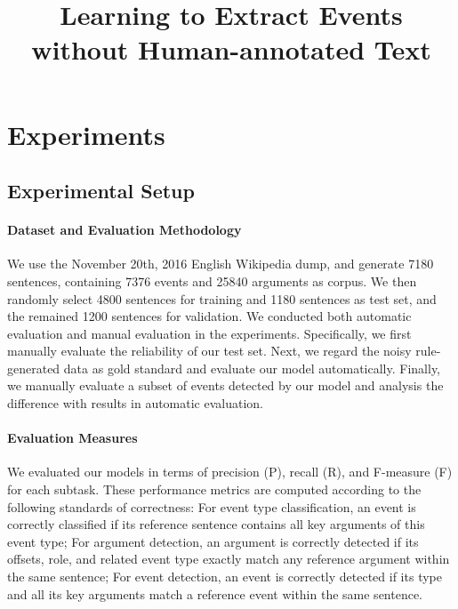 \documentclass{article}
\title{Learning to Extract Events without Human-annotated Text}
\begin{document}
\maketitle









\section{Experiments}
\subsection{Experimental Setup}
\paragraph{Dataset and Evaluation Methodology}
We use the November 20th, 2016 English Wikipedia dump, and generate 7180 sentences, containing 7376 events and 25840 arguments as corpus. We then randomly select 4800 sentences for training and 1180 sentences as test set, and the remained 1200 sentences for validation. We conducted both automatic evaluation and manual evaluation in the experiments. Specifically, we first manually evaluate the reliability of our test set. Next, we regard the noisy rule-generated data as gold standard and evaluate our model automatically. Finally, we manually evaluate a subset of events detected by our model and analysis the difference with results in automatic evaluation.

\paragraph{Evaluation Measures}
We evaluated our models in terms of precision (P), recall (R), and F-measure (F) for each subtask. These performance metrics are computed according to the following standards of correctness: For event type classification, an event is correctly classified if its reference sentence contains all key arguments of this event type; For argument detection, an argument is correctly detected if its offsets, role, and related event type exactly match any reference argument within the same sentence; For event detection, an event is correctly detected if its type and all its key arguments match a reference event within the same sentence.
\end{document}
